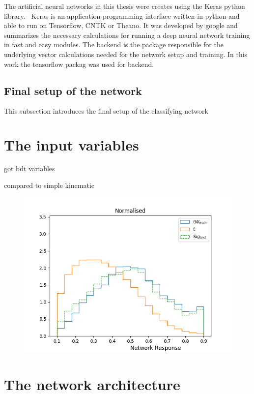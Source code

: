 The artificial neural networks in this thesis were creates using the Keras python library.~\cite{chollet2015keras} 
Keras is an application programming interface written in python and able to run on Tensorflow, CNTK or Theano. It was developed by google and summarizes the necessary calculations for running a deep neural network training in fast and easy modules.
The backend is the package responsible for the underlying vector calculations needed for the network setup and training. In this work the tensorflow packag was used for backend.~\cite{tensorflow2015-whitepaper}

\subsection{Final setup of the network}

This subsection introduces the final setup of the classifying network


\section{The input variables}

got bdt variables

compared to simple kinematic

\begin{figure}
	\centering
	\includegraphics[width=\figwidth]{figures_simpleNN/test_simple.png}
\end{figure}



\section{The network architecture}

